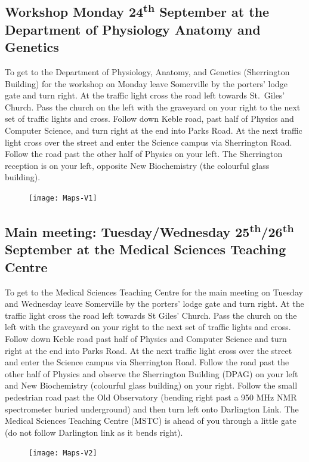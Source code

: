 \documentclass[a5paper,10pt,twoside,onecolumn,openany,helvetica,showtrims]{memoir}
\begin{document}
\subsection{Workshop Monday 24\textsuperscript{th} September at the Department of Physiology Anatomy and Genetics}
To get to the Department of Physiology, Anatomy, and Genetics (Sherrington Building) for the workshop on Monday leave Somerville by the porters' lodge gate and turn right. At the traffic light cross the road left towards St.~Giles' Church. Pass the church on the left with the graveyard on your right to the next set of traffic lights and cross. Follow down Keble road, past half of Physics and Computer Science, and turn right at the end into Parks Road. At the next traffic light cross over the street and enter the Science campus via Sherrington Road. Follow the road past the other half of Physics on your left. The Sherrington reception is on your left, opposite New Biochemistry (the colourful glass building). 

\begin{figure}[H]
\centering
\texttt{[image: Maps-V1]}
\end{figure}



\subsection{Main meeting: Tuesday/Wednesday 25\textsuperscript{th}/26\textsuperscript{th} September at the Medical Sciences Teaching Centre}
To get to the Medical Sciences Teaching Centre for the main meeting on Tuesday and Wednesday leave Somerville by the porters' lodge gate and turn right. At the traffic light cross the road left towards St Giles’ Church. Pass the church on the left with the graveyard on your right to the next set of traffic lights and cross. Follow down Keble road past half of Physics and Computer Science and turn right at the end into Parks Road. At the next traffic light cross over the street and enter the Science campus via Sherrington Road. Follow the road past the other half of Physics and observe the Sherrington Building (DPAG) on your left and New Biochemistry (colourful glass building) on your right. Follow the small pedestrian road past the Old Observatory (bending right past a 950 MHz NMR spectrometer buried underground) and then turn left onto Darlington Link. The Medical Sciences Teaching Centre (MSTC) is ahead of you through a little gate (do not follow Darlington link as it bends right). 
\begin{figure}[H]
\centering
\texttt{[image: Maps-V2]}
\end{figure}
\end{document}
